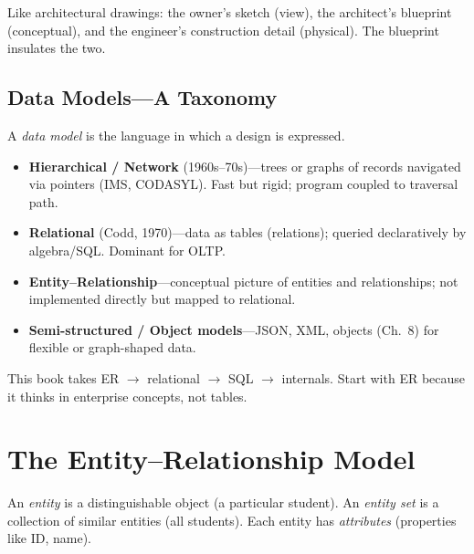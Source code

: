 Like architectural drawings: the owner's sketch (view), the architect's blueprint (conceptual), and the engineer's construction detail (physical). The blueprint insulates the two.

\subsection{Data Models---A Taxonomy}

A \emph{data model} is the language in which a design is expressed.

\begin{itemize}
    \item \textbf{Hierarchical / Network} (1960s--70s)---trees or graphs of records navigated via pointers (IMS, CODASYL). Fast but rigid; program coupled to traversal path.
    \item \textbf{Relational} (Codd, 1970)---data as tables (relations); queried declaratively by algebra/SQL. Dominant for OLTP.
    \item \textbf{Entity--Relationship}---conceptual picture of entities and relationships; not implemented directly but mapped to relational.
    \item \textbf{Semi-structured / Object models}---JSON, XML, objects (Ch.~8) for flexible or graph-shaped data.
\end{itemize}

This book takes ER $\to$ relational $\to$ SQL $\to$ internals. Start with ER because it thinks in enterprise concepts, not tables.

\section{The Entity--Relationship Model}
\label{sec:er-model}

An \emph{entity} is a distinguishable object (a particular student). An \emph{entity set} is a collection of similar entities (all students). Each entity has \emph{attributes} (properties like ID, name).


